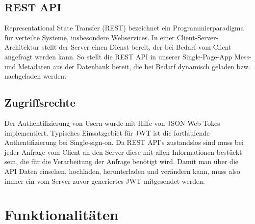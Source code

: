 





\section{REST API}

Representational State Transfer (REST) bezeichnet ein Programmierparadigma für verteilte Systeme, insbesondere Webservices. In einer Client-Server-Architektur stellt der Server einen Dienst bereit, der bei Bedarf vom Client angefragt werden kann. So stellt die REST API in unserer Single-Page-App Mess- und Metadaten aus der Datenbank bereit, die bei Bedarf dynamisch geladen bzw. nachgeladen werden.


\section{Zugriffsrechte}

Der Authentifizierung von Usern wurde mit Hilfe von JSON Web Tokes implementiert. Typisches Einsatzgebiet für JWT ist die fortlaufende Authentifizierung bei Single-sign-on. Da REST API’s zustandslos sind muss bei jeder Anfrage vom Client an den Server diese mit allen Informationen bestückt sein, die für die Verarbeitung der Anfrage benötigt wird. Damit man über die API Daten einsehen, hochladen, herunterladen und verändern kann, muss also immer ein vom Server zuvor generiertes JWT mitgesendet werden.


\chapter{Funktionalitäten} 

